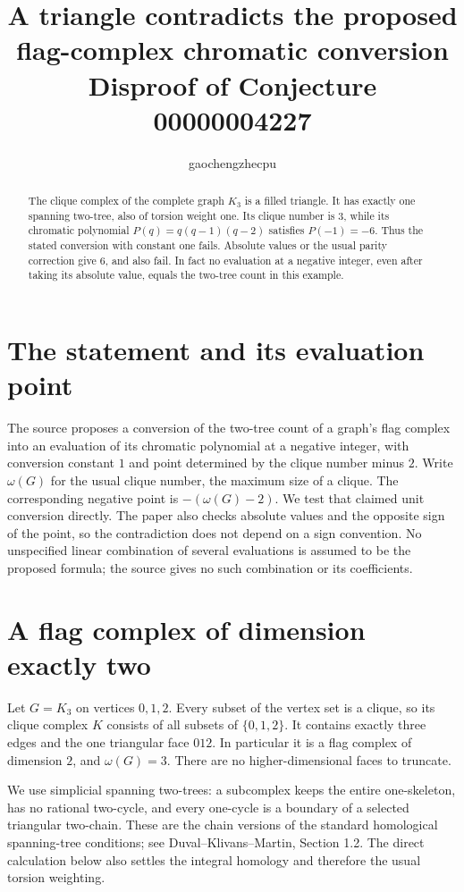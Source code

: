 \documentclass[11pt]{article}
\title{A triangle contradicts the proposed\\flag-complex chromatic conversion\\
\large Disproof of Conjecture 00000004227}
\author{gaochengzhecpu}\date{}
\begin{document}
\maketitle
\begin{abstract}
The clique complex of the complete graph $K_3$ is a filled triangle.
It has exactly one spanning two-tree, also of torsion weight one.
Its clique number is $3$, while its chromatic polynomial
$P(q)=q(q-1)(q-2)$ satisfies $P(-1)=-6$.
Thus the stated conversion with constant one fails. Absolute values or
the usual parity correction give $6$, and also fail. In fact no evaluation
at a negative integer, even after taking its absolute value, equals the
two-tree count in this example.
\end{abstract}

\section*{The statement and its evaluation point}
The source proposes a conversion of the two-tree count of a graph's flag
complex into an evaluation of its chromatic polynomial at a negative integer,
with conversion constant $1$ and point determined by the clique number
minus $2$. Write $\omega(G)$ for the usual clique number, the maximum size
of a clique. The corresponding negative point is
$-(\omega(G)-2)$. We test that claimed unit conversion directly.
The paper also checks absolute values and the opposite sign of the point,
so the contradiction does not depend on a sign convention. No unspecified
linear combination of several evaluations is assumed to be the proposed
formula; the source gives no such combination or its coefficients.

\section*{A flag complex of dimension exactly two}
Let $G=K_3$ on vertices $0,1,2$. Every subset of the vertex set is a clique,
so its clique complex $K$ consists of all subsets of $\{0,1,2\}$.
It contains exactly three edges and the one triangular face $012$.
In particular it is a flag complex of dimension $2$, and $\omega(G)=3$.
There are no higher-dimensional faces to truncate.

We use simplicial spanning two-trees: a subcomplex keeps the entire
one-skeleton, has no rational two-cycle, and every one-cycle is a
boundary of a selected triangular two-chain. These are the chain versions
of the standard homological spanning-tree conditions; see
Duval--Klivans--Martin, Section 1.2. The direct calculation below also
settles the integral homology and therefore the usual torsion weighting.
\end{document}

